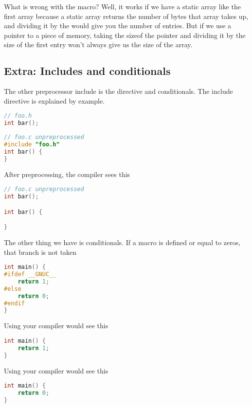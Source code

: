 What is wrong with the macro? Well, it works if we have a static array like the first array because  a static array returns the number of bytes that array takes up, and dividing it by the  would give you the number of entries. But if we use a pointer to a piece of memory, taking the sizeof the pointer and dividing it by the size of the first entry won't always give us the size of the array.

\subsection{Extra: Includes and conditionals}

The other preprocessor include is the  directive and conditionals. The include directive is explained by example.

\begin{lstlisting}[language=C]
// foo.h
int bar();
\end{lstlisting}

\begin{lstlisting}[language=C]
// foo.c unpreprocessed
#include "foo.h"
int bar() {
}
\end{lstlisting}

After preprocessing, the compiler sees this

\begin{lstlisting}[language=C]
// foo.c unpreprocessed
int bar();

int bar() {

}
\end{lstlisting}

The other thing we have is conditionals. If a macro is defined or equal to zeros, that branch is not taken

\begin{lstlisting}[language=C]
int main() {
#ifdef __GNUC__
    return 1;
#else
    return 0;
#endif
}
\end{lstlisting}

Using  your compiler would see this

\begin{lstlisting}[language=C]
int main() {
    return 1;
}
\end{lstlisting}


Using  your compiler would see this

\begin{lstlisting}[language=C]
int main() {
    return 0;
}
\end{lstlisting}


